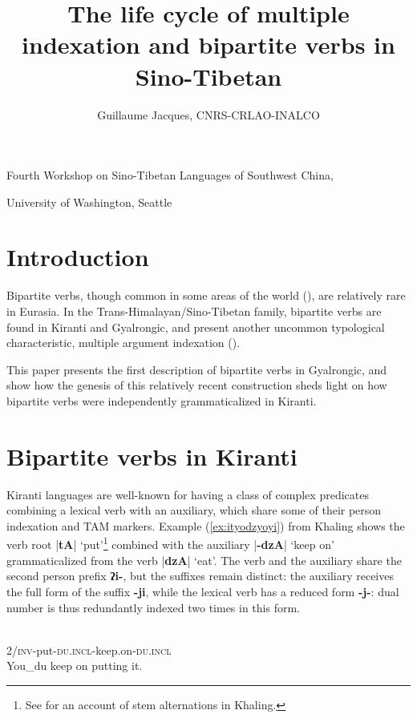 \documentclass[oldfontcommands,oneside,a4paper,11pt]{article}
\newcommand{\ipa}[1]{{\phon\textbf{#1}}}
\newcommand{\dhatu}[2]{|\ipa{#1}| `#2'}
\begin{document}
 
\title{The life cycle of multiple indexation and bipartite verbs in Sino-Tibetan}
\author{Guillaume Jacques, CNRS-CRLAO-INALCO}
\maketitle

Fourth Workshop on Sino-Tibetan Languages of Southwest China, 

University of Washington, Seattle

 \section*{Introduction}
Bipartite verbs, though common in some areas of the world (\citealt{delancey96bipartite}), are relatively rare in Eurasia. In the Trans-Himalayan/Sino-Tibetan family, bipartite verbs are found in Kiranti and Gyalrongic, and present another uncommon typological characteristic, 
multiple argument indexation (\citealt{denk15multiple}).

This paper presents the first description of bipartite verbs in Gyalrongic, and show how the genesis of this relatively recent construction sheds light on how bipartite verbs were independently grammaticalized in Kiranti.

\section{Bipartite verbs in Kiranti}
Kiranti languages are well-known for having a class of complex predicates combining a lexical verb with an auxiliary, which share some of their person indexation and TAM markers. Example (\ref{ex:ityodzyoyi}) from Khaling shows the verb root \dhatu{tA}{put}\footnote{See \citet{jacques12khaling} for an account of stem alternations in Khaling.} combined with the auxiliary \dhatu{-dzA}{keep on} grammaticalized from the verb \dhatu{dzA}{eat}. The verb and the auxiliary share the second person prefix \ipa{ʔi-}, but the suffixes remain distinct: the auxiliary receives the full form of the suffix \ipa{-ji}, while the lexical verb has a reduced form \ipa{-j-}: dual number is thus redundantly indexed two times in this form.

\begin{exe}
\ex \label{ex:ityodzyoyi}
\gll \ipa{ʔi-tɵ-j-dzɵ-ji}\\
2/\textsc{inv}-put-\textsc{du.incl}-keep.on-\textsc{du.incl} \\
\glt You_{du} keep on putting it.
\end{exe}
\end{document}
